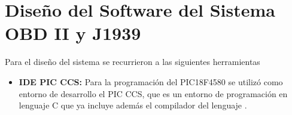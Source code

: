 

\section {Diseño del Software del Sistema OBD II y J1939}
Para el diseño del sistema se recurrieron a las siguientes herramientas 
\begin{itemize}
    \item \textbf{IDE PIC CCS: } Para la programación del PIC18F4580 se utilizó como entorno de desarrollo el PIC CCS, que es un entorno de programación en lenguaje C que ya incluye además el compilador del lenguaje \cite{ccs}. 
    

\end{itemize}
